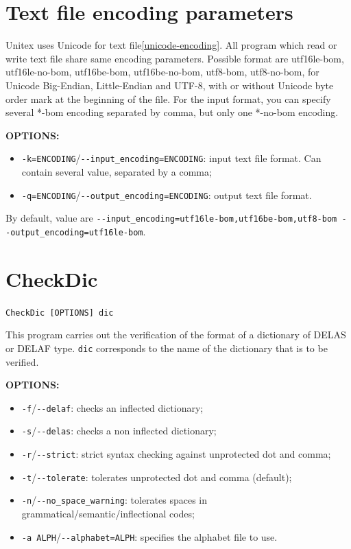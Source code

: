 \section{Text file encoding parameters}
\label{section-text-file-encoding-parameters}
Unitex uses Unicode for text file\ref{unicode-encoding}. All program which read or write
text file share same encoding parameters. Possible format are 
utf16le-bom, utf16le-no-bom, utf16be-bom, utf16be-no-bom, utf8-bom, utf8-no-bom, 
for Unicode Big-Endian, Little-Endian and UTF-8, with or without Unicode byte order mark at the beginning of the file.
For the input format, you can specify several *-bom encoding separated by comma, but only one *-no-bom encoding.

\bigskip
\noindent \textbf{OPTIONS:}
\begin{itemize}
  \item \verb+-k=ENCODING+/\verb+--input_encoding=ENCODING+: input text file format. Can contain several value, separated by a comma;
  \item \verb+-q=ENCODING+/\verb+--output_encoding=ENCODING+: output text file format. 
\end{itemize}

By default, value are \verb+--input_encoding=utf16le-bom,utf16be-bom,utf8-bom --output_encoding=utf16le-bom+.


\section{CheckDic}
\verb+CheckDic [OPTIONS] dic+

\bigskip
\noindent This program carries out the verification of the format of a dictionary
of DELAS or DELAF type. \verb+dic+ corresponds to the name
of the dictionary that is to be verified. 

\bigskip
\noindent \textbf{OPTIONS:}
\begin{itemize}
  \item \verb+-f+/\verb+--delaf+: checks an inflected dictionary;
  \item \verb+-s+/\verb+--delas+: checks a non inflected dictionary;
  \item \verb+-r+/\verb+--strict+: strict syntax checking against unprotected dot and comma;
  \item \verb+-t+/\verb+--tolerate+: tolerates unprotected dot and comma (default);
  \item \verb+-n+/\verb+--no_space_warning+: tolerates spaces in
  grammatical/semantic/inflectional codes;
  \item \verb+-a ALPH+/\verb+--alphabet=ALPH+: specifies the alphabet file to
        use. 
        
\end{itemize}


